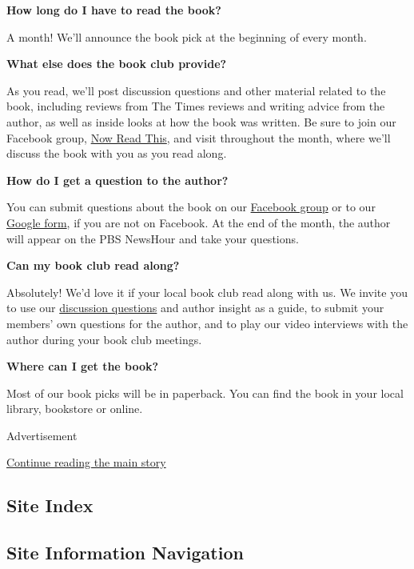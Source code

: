 \textbf{How long do I have to read the book?}

A month! We'll announce the book pick at the beginning of every month.

\textbf{What else does the book club provide?}

As you read, we'll post discussion questions and other material related
to the book, including reviews from The Times reviews and writing advice
from the author, as well as inside looks at how the book was written. Be
sure to join our Facebook group,
\href{https://www.facebookcorewwwi.onion/groups/NowReadThisBookClub/}{Now
Read This}, and visit throughout the month, where we'll discuss the book
with you as you read along.

\textbf{How do I get a question to the author?}

You can submit questions about the book on our
\href{https://www.facebookcorewwwi.onion/groups/NowReadThisBookClub/}{Facebook
group} or to our
\href{https://docs.google.com/forms/d/e/1FAIpQLScCrXPslIAloxbvQHhHrNmhhzQ2_dfzJu-FP7ja8XpQnDPhpw/viewform}{Google
form}, if you are not on Facebook. At the end of the month, the author
will appear on the PBS NewsHour and take your questions.

\textbf{Can my book club read along?}

Absolutely! We'd love it if your local book club read along with us. We
invite you to use our
\href{https://www.pbs.org/newshour/features/now-read-this/}{discussion
questions} and author insight as a guide, to submit your members' own
questions for the author, and to play our video interviews with the
author during your book club meetings.

\textbf{Where can I get the book?}

Most of our book picks will be in paperback. You can find the book in
your local library, bookstore or online.

Advertisement

\protect\hyperlink{after-bottom}{Continue reading the main story}

\hypertarget{site-index}{%
\subsection{Site Index}\label{site-index}}

\hypertarget{site-information-navigation}{%
\subsection{Site Information
Navigation}\label{site-information-navigation}}

